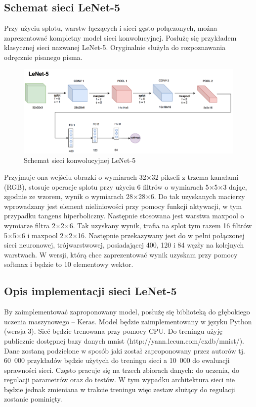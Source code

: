 \subsection{Schemat sieci LeNet-5}

Przy użyciu splotu, warstw łączących i sieci gęsto połączonych, można zaprezentować kompletny model sieci konwolucyjnej. Posłużę się przykładem klasycznej sieci nazwanej LeNet-5. Oryginalnie służyła do rozpoznawania odręcznie pisanego pisma.

\begin{figure}[ht]
\centerline{\includegraphics[scale=1]{resources/lenet5.png}}
\caption{Schemat sieci konwolucyjnej LeNet-5}
\label{fig:lenet5}
\end{figure}

Przyjmuje ona wejściu obrazki o wymiarach 32\(\times\)32 pikseli z trzema kanałami (RGB), stosuje operacje splotu przy użyciu 6 filtrów o wymiarach 5\(\times\)5\(\times\)3 dając, zgodnie ze wzorem, wynik o wymiarach 28\(\times\)28\(\times\)6. Do tak uzyskanych macierzy wprowadzany jest element nieliniowości przy pomocy funkcji aktywacji, w tym przypadku tangens hiperboliczny. Następnie stosowana jest warstwa maxpool o wymiarze filtra 2\(\times\)2\(\times\)6. Tak uzyskany wynik, trafia na splot
tym razem 16 filtrów 5\(\times\)5\(\times\)6 i maxpool 2\(\times\)2\(\times\)16. Następnie przekazywany jest do w pełni połączonej sieci neuronowej, trójwarstwowej, posiadającej 400, 120 i 84 węzły na kolejnych warstwach. W wersji, którą chce zaprezentować wynik uzyskam przy pomocy softmax i będzie to 10 elementowy wektor.

\subsection{Opis implementacji sieci LeNet-5}

By zaimplementować zaproponowany model, posłużę się biblioteką do
głębokiego uczenia maszynowego -- Keras. Model będzie zaimplementowany w
języku Python (wersja 3). Sieć będzie trenowana przy pomocy CPU. Do
treningu użyję publicznie dostępnej bazy danych mnist
(http://yann.lecun.com/exdb/mnist/). Dane zostaną podzielone w
sposób jaki został zaproponowany przez autorów tj. 60~000 przykładów
będzie użytych do treningu sieci a 10~000 do ewaluacji sprawności sieci.
Często pracuje się na trzech zbiorach danych: do uczenia, do regulacji
parametrów oraz do testów. W tym wypadku architektura sieci nie będzie
jednak zmieniana w trakcie treningu więc zestaw służący do regulacji
zostanie pominięty.

